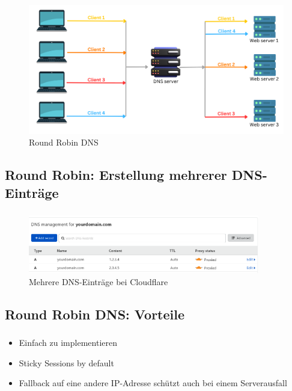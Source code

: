 \begin{frame}
    \frametitle{\insertsection}
    \framesubtitle{\insertsubsection}

	\vspace*{-12pt}
    \begin{figure}[h]
        \centering
        \captionsetup{aboveskip=0pt}
        \includegraphics[width=.7\textwidth]{../images/roundrobindns}
        \caption{Round Robin DNS~\cite{cloudns-roundrobin}}
    \end{figure}
\end{frame}

\subsection{Round Robin: Erstellung mehrerer DNS-Einträge}
\begin{frame}
    \frametitle{\insertsection}
    \framesubtitle{\insertsubsection}
	
	\vspace{-12pt} %
    \begin{figure}[h]
        \centering
        \includegraphics[width=0.9\textwidth]{../images/cloudflare-multiple-dns}
        \caption{Mehrere DNS-Einträge bei Cloudflare}
    \end{figure}
\end{frame}

\subsection{Round Robin DNS: Vorteile}
\begin{frame}
    \frametitle{\insertsection}
    \framesubtitle{\insertsubsection}

    \begin{itemize}
    	\item Einfach zu implementieren
    	\item Sticky Sessions by default
    	\item Fallback auf eine andere IP-Adresse schützt auch bei einem Serverausfall
    \end{itemize}
\end{frame}

